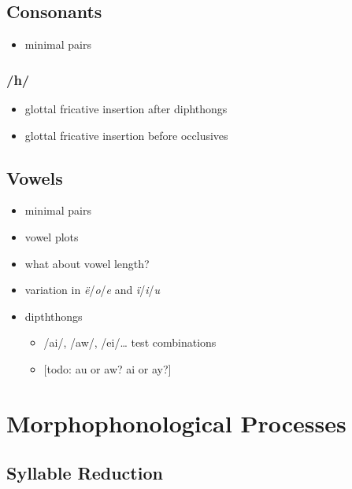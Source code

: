 \documentclass{memoir}
\begin{document}
\subsection{\texorpdfstring{Consonants
\label{sec:consonants}}{Consonants }}

\begin{itemize}
\tightlist
\item
  minimal pairs
\end{itemize}

\subsubsection{/h/}

\begin{itemize}
\tightlist
\item
  glottal fricative insertion after diphthongs
\item
  glottal fricative insertion before occlusives
\end{itemize}

\subsection{\texorpdfstring{Vowels \label{sec:vowels}}{Vowels }}

\begin{itemize}
\item
  minimal pairs
\item
  vowel plots
\item
  what about vowel length?
\item
  variation in \emph{ë}/\emph{o}/\emph{e} and \emph{ï}/\emph{i}/\emph{u}
\item
  dipththongs

  \begin{itemize}
  \tightlist
  \item
    /ai/, /aw/, /ei/\ldots{} test combinations
  \item
    {[}todo: au or aw? ai or ay?{]}
  \end{itemize}
\end{itemize}

\section{\texorpdfstring{Morphophonological Processes
\label{sec:morphophono}}{Morphophonological Processes }}

\subsection{\texorpdfstring{Syllable Reduction
\label{sec:sylred}}{Syllable Reduction }}
\end{document}
